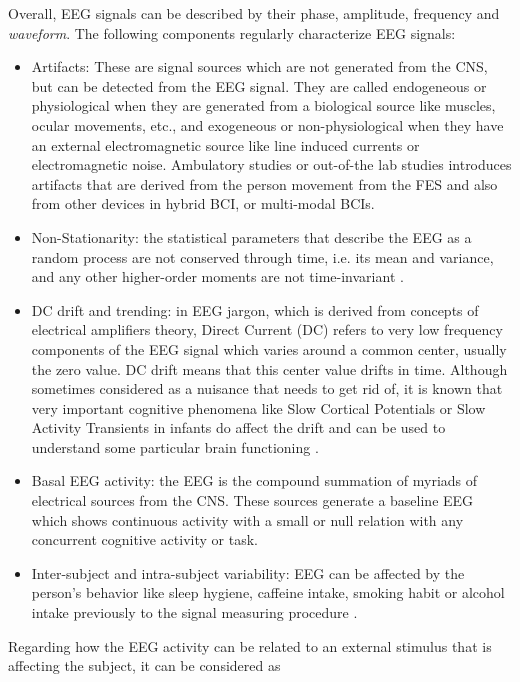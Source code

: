 Overall, EEG signals can be described by their phase, amplitude,  frequency and \textit{waveform}.  The following components regularly  characterize EEG signals:

\begin{itemize}
\item Artifacts:  These are signal sources which are not generated from the CNS, but can be detected from the EEG signal.  They are called endogeneous or physiological when they are generated from a biological source like muscles, ocular movements, etc., and exogeneous or non-physiological when they have an external electromagnetic source like line induced currents or electromagnetic noise\cite{Weeda2012}.  Ambulatory studies or out-of-the lab studies introduces artifacts that are derived from the person movement from the FES and also from other devices in hybrid BCI, or multi-modal BCIs.
\item Non-Stationarity: the statistical parameters that describe the EEG as a random process are not conserved through time, i.e. its mean and variance, and any other higher-order moments are not time-invariant \cite{Jansen1991}.
\item DC drift and trending: in EEG jargon, which is derived from concepts of electrical amplifiers theory, Direct Current (DC) refers to very low frequency components of the EEG signal which varies around a common center, usually the zero value.  DC drift means that this center value drifts in time.  Although sometimes considered as a nuisance that needs to get rid of, it is known that very important cognitive phenomena like Slow Cortical Potentials or Slow Activity Transients in infants do affect the drift and can be used to understand some particular brain functioning \cite{Schomer2010}.
\item Basal EEG activity: the EEG is the compound summation of myriads of electrical sources from the CNS.  These sources generate a baseline EEG which shows continuous activity with a small or null relation with any concurrent cognitive activity or task.
\item Inter-subject and intra-subject variability: EEG can be affected by the person's behavior like sleep hygiene, caffeine intake, smoking habit or alcohol intake previously to the signal measuring procedure \cite{Farzan2017}.
\end{itemize}

Regarding how the EEG activity can be related to an external stimulus that is affecting the subject, it can be considered as

